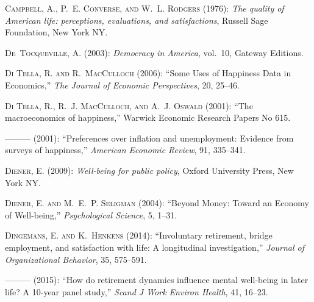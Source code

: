 \documentclass[10pt, letterpaper]{article}
\begin{document}
\begin{spacing}{1.4}
\begin{thebibliography}{87}
\textsc{Campbell, A., P.~E. Converse, and W.~L. Rodgers} (1976): \emph{The
  quality of American life: perceptions, evaluations, and satisfactions},
  Russell Sage Foundation, New York NY.

\textsc{De~Tocqueville, A.} (2003): \emph{Democracy in America}, vol.~10,
  Gateway Editions.

\textsc{{Di Tella}, R. and R.~MacCulloch} (2006): \enquote{Some Uses of
  Happiness Data in Economics,} \emph{The Journal of Economic Perspectives},
  20, 25--46.

\textsc{{Di Tella}, R., R.~J. MacCulloch, and A.~J. Oswald}
  (2001{}): \enquote{The macroeconomics of happiness,} Warwick
  Economic Research Papers No 615.

---\hspace{-.1pt}---\hspace{-.1pt}--- (2001{}):
  \enquote{Preferences over inflation and unemployment: Evidence from surveys
  of happiness,} \emph{American Economic Review}, 91, 335--341.

\textsc{Diener, E.} (2009): \emph{Well-being for public policy}, Oxford
  University Press, New York NY.

\textsc{Diener, E. and M.~E.~P. Seligman} (2004): \enquote{Beyond Money: Toward
  an Economy of Well-being,} \emph{Psychological Science}, 5, 1--31.

\textsc{Dingemans, E. and K.~Henkens} (2014): \enquote{Involuntary retirement,
  bridge employment, and satisfaction with life: A longitudinal investigation,}
  \emph{Journal of Organizational Behavior}, 35, 575--591.

---\hspace{-.1pt}---\hspace{-.1pt}--- (2015): \enquote{How do retirement
  dynamics influence mental well-being in later life? A 10-year panel study,}
  \emph{Scand J Work Environ Health}, 41, 16--23.


\end{thebibliography}
\end{spacing}
\end{document}
